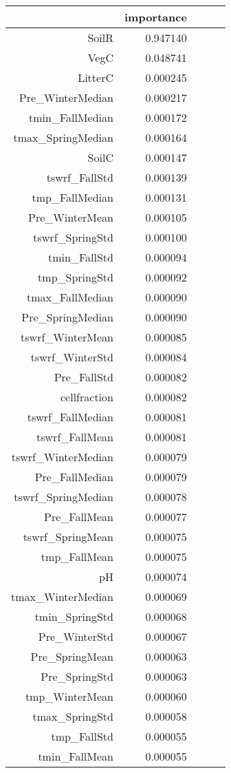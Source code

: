 \begin{tabular}{rrrrr}
\toprule
 & importance \\
\midrule
SoilR & 0.947140 \\
VegC & 0.048741 \\
LitterC & 0.000245 \\
Pre_WinterMedian & 0.000217 \\
tmin_FallMedian & 0.000172 \\
tmax_SpringMedian & 0.000164 \\
SoilC & 0.000147 \\
tswrf_FallStd & 0.000139 \\
tmp_FallMedian & 0.000131 \\
Pre_WinterMean & 0.000105 \\
tswrf_SpringStd & 0.000100 \\
tmin_FallStd & 0.000094 \\
tmp_SpringStd & 0.000092 \\
tmax_FallMedian & 0.000090 \\
Pre_SpringMedian & 0.000090 \\
tswrf_WinterMean & 0.000085 \\
tswrf_WinterStd & 0.000084 \\
Pre_FallStd & 0.000082 \\
cellfraction & 0.000082 \\
tswrf_FallMedian & 0.000081 \\
tswrf_FallMean & 0.000081 \\
tswrf_WinterMedian & 0.000079 \\
Pre_FallMedian & 0.000079 \\
tswrf_SpringMedian & 0.000078 \\
Pre_FallMean & 0.000077 \\
tswrf_SpringMean & 0.000075 \\
tmp_FallMean & 0.000075 \\
pH & 0.000074 \\
tmax_WinterMedian & 0.000069 \\
tmin_SpringStd & 0.000068 \\
Pre_WinterStd & 0.000067 \\
Pre_SpringMean & 0.000063 \\
Pre_SpringStd & 0.000063 \\
tmp_WinterMean & 0.000060 \\
tmax_SpringStd & 0.000058 \\
tmp_FallStd & 0.000055 \\
tmin_FallMean & 0.000055 \\

\end{tabular}
